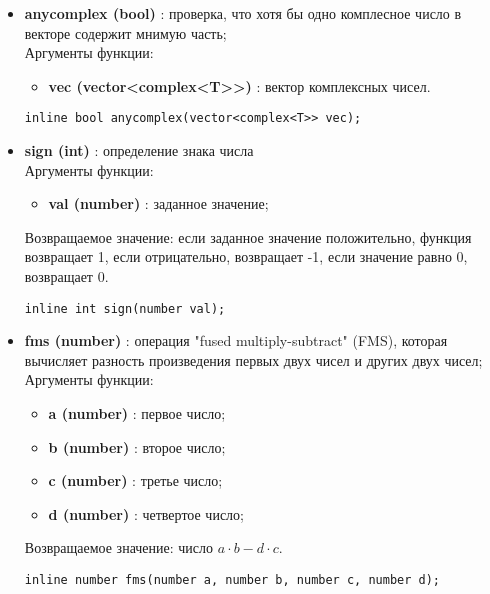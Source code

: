 \documentclass[a4paper,12pt]{article}
\begin{document}
\begin{itemize}
    \item \textbf{anycomplex (bool)} : проверка, что хотя бы одно комплесное число в векторе содержит мнимую часть;
    \\Аргументы функции:
    \begin{itemize}
        \renewcommand{\labelitemi}{-}
        \item \textbf{vec (vector<complex<T>>)} : вектор комплексных чисел.
    \end{itemize}
    \begin{lstlisting}[language=С++]
inline bool anycomplex(vector<complex<T>> vec); \end{lstlisting}

    \item \textbf{sign (int)} : определение знака числа
    \\Аргументы функции:
    \begin{itemize}
        \renewcommand{\labelitemi}{-}
        \item \textbf{val (number)} : заданное значение;
    \end{itemize}

    Возвращаемое значение: если заданное значение положительно, функция возвращает 1, если отрицательно, возвращает -1, если значение равно 0, возвращает 0.

    \begin{lstlisting}[language=С++]
inline int sign(number val); \end{lstlisting}

    \item \textbf{fms (number)} : операция "fused multiply-subtract" (FMS), которая вычисляет разность произведения первых двух чисел и других двух чисел;
    \\Аргументы функции:
    \begin{itemize}
        \renewcommand{\labelitemi}{-}
        \item \textbf{a (number)} : первое число;
        \item \textbf{b (number)} : второе число;
        \item \textbf{c (number)} : третье число;
        \item \textbf{d (number)} : четвертое число;
    \end{itemize}
    Возвращаемое значение: число $a\cdot b - d \cdot c$.

    \begin{lstlisting}[language=С++]
inline number fms(number a, number b, number c, number d); \end{lstlisting}


\end{itemize}
\end{document}
